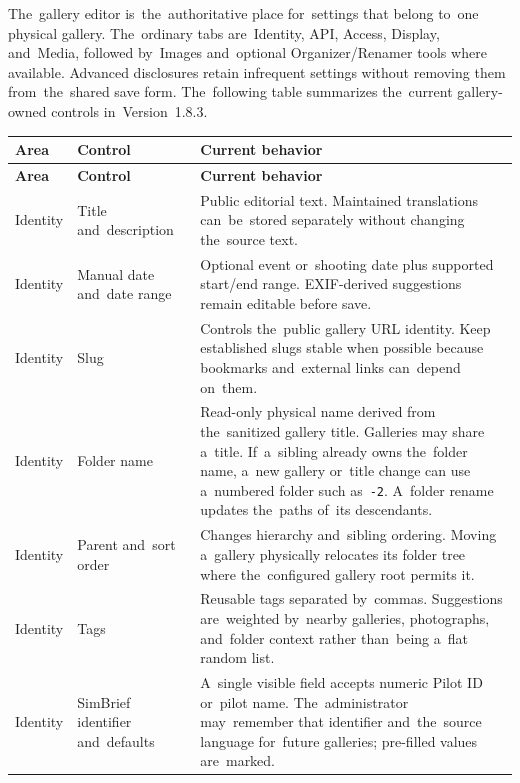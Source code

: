 \documentclass[11pt,a4paper]{article}
\newcommand{\version}{1.8.3}
\newcommand{\codeword}[1]{\nolinkurl{#1}}
\begin{document}

The~gallery editor is~the~authoritative place for~settings that belong to~one
physical gallery. The~ordinary tabs are~Identity, API, Access, Display,
and~Media, followed by~Images and~optional Organizer/Renamer tools where
available. Advanced disclosures retain infrequent settings without removing them
from~the~shared save form. The~following table summarizes the~current
gallery-owned controls in~Version~\version{}.

\begin{longtable}{%
    >{\raggedright\arraybackslash}p{}%
    >{\raggedright\arraybackslash}p{}%
    >{\raggedright\arraybackslash}p{}%
}
\toprule
\textbf{Area} & \textbf{Control} & \textbf{Current behavior}\\
\midrule
\endfirsthead
\toprule
\textbf{Area} & \textbf{Control} & \textbf{Current behavior}\\
\midrule
\endhead
Identity & Title and~description & Public editorial text. Maintained
translations can~be~stored separately without changing the~source text.\\
Identity & Manual date and~date range & Optional event or~shooting date plus
supported start/end range. EXIF-derived suggestions remain editable before
save.\\
Identity & Slug & Controls the~public gallery URL identity. Keep established
slugs stable when possible because bookmarks and~external links can~depend
on~them.\\
Identity & Folder name & Read-only physical name derived from the~sanitized
gallery title. Galleries may share a~title. If~a~sibling already owns the~folder
name, a~new gallery or~title change can use a~numbered folder such as~\codeword{-2}.
A~folder rename updates the~paths of~its descendants.\\
Identity & Parent and~sort order & Changes hierarchy and~sibling ordering.
Moving a~gallery physically relocates its folder tree where the~configured
gallery root permits it.\\
Identity & Tags & Reusable tags separated by~commas. Suggestions are~weighted
by~nearby galleries, photographs, and~folder context rather than~being a~flat
random list.\\
Identity & SimBrief identifier and~defaults & A~single visible field accepts
numeric Pilot ID or~pilot name. The~administrator may~remember that identifier
and~the~source language for~future galleries; pre-filled values are~marked.\\

\end{longtable}
\end{document}
